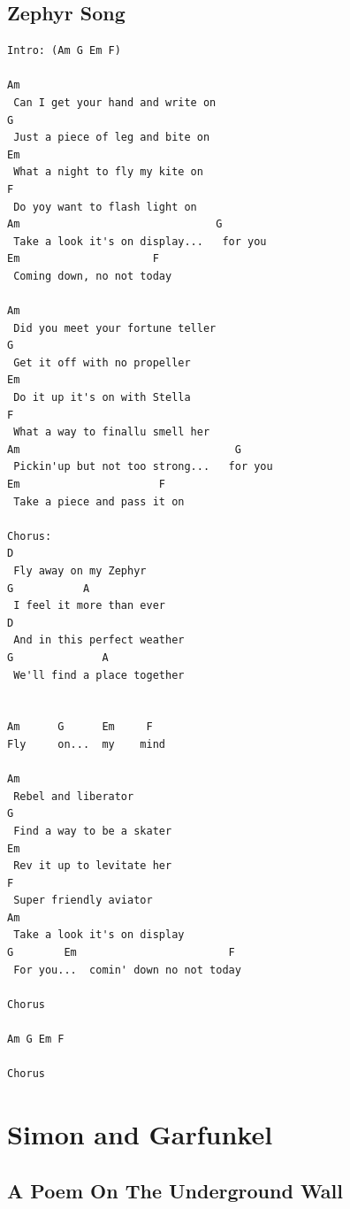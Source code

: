 \documentclass[a4paper]{article}
\begin{document}
\subsection{Zephyr Song} %
\label{sub:Zephyr Song}
\begin{Verbatim}[commandchars=\\\{\}]
	  Intro: (Am G Em F) 
 
Am                             
 Can I get your hand and write on 
G  
 Just a piece of leg and bite on 
Em 
 What a night to fly my kite on 
F 
 Do yoy want to flash light on 
Am                               G
 Take a look it's on display...   for you 
Em                     F   
 Coming down, no not today 

Am 
 Did you meet your fortune teller 
G 
 Get it off with no propeller 
Em 
 Do it up it's on with Stella 
F 
 What a way to finallu smell her 
Am                                  G 
 Pickin'up but not too strong...   for you 
Em                      F 
 Take a piece and pass it on 
￼￼
Chorus:
D 
 Fly away on my Zephyr 
G           A 
 I feel it more than ever 
D 
 And in this perfect weather 
G              A 
 We'll find a place together
￼
 
Am      G      Em     F 
Fly     on...  my    mind 
 
Am 
 Rebel and liberator 
G 
 Find a way to be a skater 
Em 
 Rev it up to levitate her 
F 
 Super friendly aviator 
Am 
 Take a look it's on display 
G        Em                        F 
 For you...  comin' down no not today 
 
Chorus 
 
Am G Em F
 
Chorus
\end{Verbatim}
\newpage
\section{Simon and Garfunkel} %
\label{sec:Simon and Garfunkel}
\subsection{A Poem On The Underground Wall} %
\label{sub:A Poem On The Underground Wall}
\end{document}
